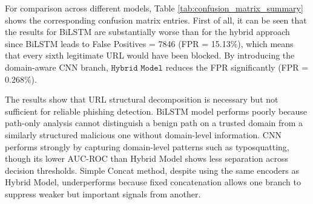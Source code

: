 \documentclass[conference]{IEEEtran}
\begin{document}
For comparison across different models, Table \ref{tab:confusion_matrix_summary} shows the corresponding confusion matrix entries. First of all, it can be seen that the results for BiLSTM are substantially worse than for the hybrid approach since BiLSTM leads to False Positives = 7846 (FPR = 15.13\%), which means that every sixth legitimate URL would have been blocked. By introducing the domain-aware CNN branch, $\texttt{Hybrid Model}$ reduces the FPR significantly (FPR = 0.268\%).

\begin{table}[htbp]
\caption{Confusion Matrix Summary - All Models (Test Set)}
\label{tab:confusion_matrix_summary}
\centering
{}
\end{table}

The results show that URL structural decomposition is necessary but not sufficient for reliable phishing detection. BiLSTM model performs poorly because path-only analysis cannot distinguish a benign path on a trusted domain from a similarly structured malicious one without domain-level information. CNN performs strongly by capturing domain-level patterns such as typosquatting, though its lower AUC-ROC than Hybrid Model shows less separation across decision thresholds. Simple Concat method, despite using the same encoders as Hybrid Model, underperforms because fixed concatenation allows one branch to suppress weaker but important signals from another.


\end{document}
